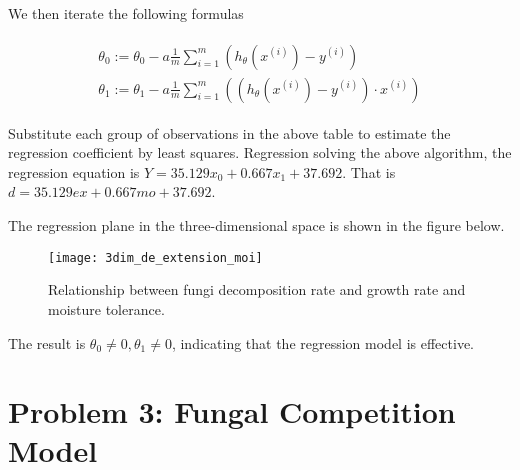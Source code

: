 \documentclass{mcmthesis}
\begin{document}




We then iterate the following formulas

\begin{equation}
  \begin{split}
    \begin{array}{l}
      \theta_{0}:=\theta_{0}-a \frac{1}{m} \sum_{i=1}^{m}\left(h_{\theta}\left(x^{(i)}\right)-y^{(i)}\right) \\
      \theta_{1}:=\theta_{1}-a \frac{1}{m} \sum_{i=1}^{m}\left(\left(h_{\theta}\left(x^{(i)}\right)-y^{(i)}\right) \cdot x^{(i)}\right)
    \end{array}
  \end{split}
\end{equation}

Substitute each group of observations in the above table to estimate the regression coefficient by least squares. Regression solving the above algorithm, the regression equation is $ Y = 35.129x_0 +0.667x_1 + 37.692 $. That is $ d = 35.129ex +0.667mo + 37.692 $.

The regression plane in the three-dimensional space is shown in the figure below.

\begin{figure}[H]
  \small
  \centering
  \texttt{[image: 3dim\_de\_extension\_moi]}
  \caption{Relationship between fungi decomposition rate and growth rate and moisture tolerance.}
  \label{3dim_de_extension_moi}
\end{figure}

The result is $ \theta_0\ne0,\theta_1\ne 0 $, indicating that the regression model is effective.

\section{Problem 3: Fungal Competition Model}
\end{document}
